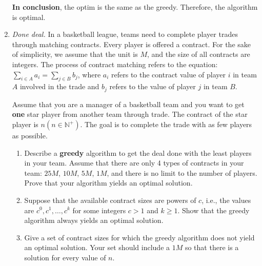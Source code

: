 \documentclass[12pt,a4paper]{article}
\makeatletter
\newtheorem*{solution}{Solution}
\theoremstyle{definition}
\renewenvironment{solution}[1][Solution] {\par\pushQED{\qed}\normalfont\topsep6\p@\@plus6\p@\relax\trivlist\item[\hskip\labelsep\bfseries#1\@addpunct{.}]\ignorespaces}{\popQED\endtrivlist\@endpefalse} \makeatother
\makeatother
\begin{document}
\begin{enumerate}
\textbf{In conclusion}, the optim is the same as the greedy. Therefore, the algorithm is optimal.	
	\item \textit{Done deal.} In a basketball league, teams need to complete player trades through matching contracts. Every player is offered a contract. For the sake of simplicity, we assume that the unit is $ M $, and the size of all contracts are integers. The process of contract matching refers to the equation: $ \sum_{i\in A} a_{i}=\sum_{j\in B} b_{j} $, where $ a_{i} $ refers to the contract value of player $ i $ in team $A$ involved in the trade and $ b_{j} $ refers to the value of player $ j $ in team $B$. 
	
	Assume that you are a manager of a basketball team and you want to get \textbf{one} star player from another team through trade. The contract of the star player is $ n (n\in \mathbb{N}^+) $. The goal is to complete the trade with as few players as possible. 
	
	\begin{enumerate}
		\item Describe a \textbf{greedy} algorithm to get the deal done with the least players in your team. Assume that there are only 4 types of contracts in your team: $25M$, $ 10M $, $ 5M $, $ 1M $, and there is no limit to the number of players. Prove that your algorithm yields an optimal solution.
		\item Suppose that the available contract sizes are powers of $c$,
		i.e., the values are $c^{0}, c^{1}, \ldots, c^{k}$ for some integers $c>1$ and $k \geq 1$. Show that the greedy algorithm always yields an optimal solution.
		\item Give a set of contract sizes for which the greedy algorithm does not yield an optimal solution. Your set should include a $ 1M $ so that there is a solution for every value of $ n $.
	\end{enumerate}
	

\end{enumerate}
\end{document}
